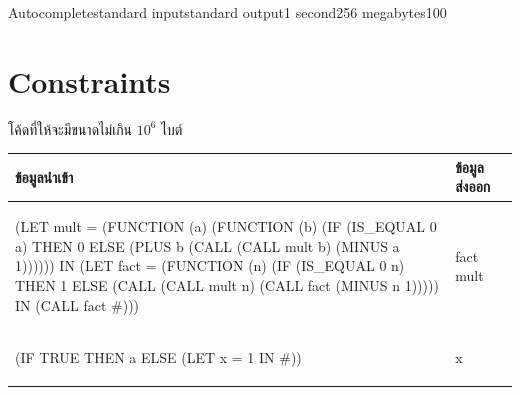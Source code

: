 \documentclass[11pt,a4paper]{article}
\begin{document}
\begin{problem}{Autocomplete}{standard input}{standard output}{1 second}{256 megabytes}{100}
\section*{Constraints}

  โค้ดที่ให้จะมีขนาดไม่เกิน $10^6$ ไบต์

\Examples

  \begin{tabular}{|M{12cm}|M{3.5cm}|N}
    \hline
    \textbf{ข้อมูลนำเข้า} & \textbf{ข้อมูลส่งออก} & \\[5pt]
    \hline \hline


    {\begin{codetumso}
(LET mult = (FUNCTION (a)
              (FUNCTION (b)
                (IF (IS_EQUAL 0 a)
                 THEN 0
                 ELSE (PLUS b (CALL (CALL mult b)
                                    (MINUS a 1)))))) IN
  (LET fact = (FUNCTION (n)
                (IF (IS_EQUAL 0 n)
                 THEN 1
                 ELSE (CALL (CALL mult n)
                            (CALL fact
                                  (MINUS n 1))))) IN
    (CALL fact #)))
    \end{codetumso}} & {\begin{codetumso}
fact
mult
    \end{codetumso}}
    \\ \hline


    {\begin{codetumso}
(IF TRUE THEN a ELSE (LET x = 1 IN #))
    \end{codetumso}} & {\begin{codetumso}
x
    \end{codetumso}} \\ \hline
\end{tabular}

\end{problem}
\end{document}

